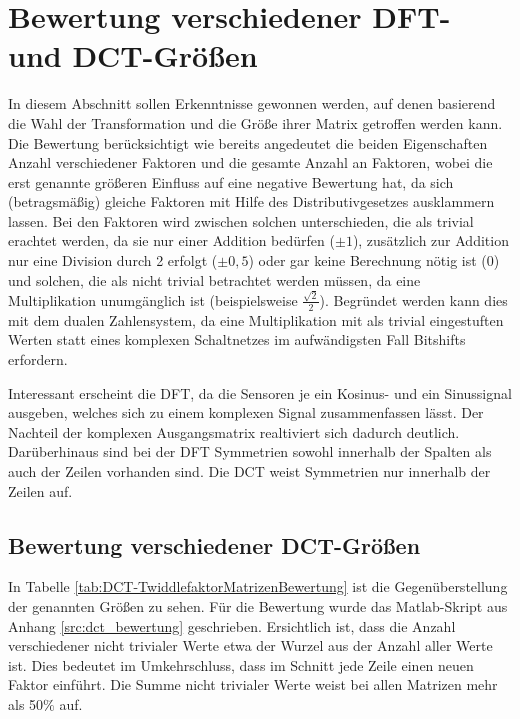 \section{Bewertung verschiedener DFT- und DCT-Größen}\label{sec:BewertungVerschiedenerGroessen}
In diesem Abschnitt sollen Erkenntnisse gewonnen werden, auf denen basierend die Wahl der Transformation und die Größe ihrer Matrix getroffen werden kann.
Die Bewertung berücksichtigt wie bereits angedeutet die beiden Eigenschaften Anzahl verschiedener Faktoren und die gesamte Anzahl an Faktoren, wobei die erst genannte 
größeren Einfluss auf eine negative Bewertung hat, da sich (betragsmäßig) gleiche Faktoren mit Hilfe des Distributivgesetzes ausklammern lassen.
Bei den Faktoren wird zwischen solchen unterschieden, die als trivial erachtet werden, da sie nur einer Addition bedürfen ($\pm1$), zusätzlich
zur Addition nur eine Division durch 2 erfolgt ($\pm0,5$) oder gar keine Berechnung nötig ist ($0$) und solchen, die als nicht trivial betrachtet werden müssen, da eine Multiplikation
unumgänglich ist (beispielsweise $\tfrac{\sqrt{2}}{2}$). Begründet werden kann dies mit dem dualen Zahlensystem, da eine Multiplikation mit als trivial eingestuften Werten statt eines 
komplexen Schaltnetzes im aufwändigsten Fall Bitshifts erfordern.

Interessant erscheint die DFT, da die Sensoren je ein Kosinus- und ein Sinussignal ausgeben, welches sich zu einem komplexen Signal zusammenfassen lässt. Der Nachteil der komplexen Ausgangsmatrix realtiviert sich dadurch deutlich. Darüberhinaus sind bei der DFT Symmetrien sowohl innerhalb der Spalten als auch der Zeilen vorhanden sind. Die DCT weist Symmetrien nur innerhalb der Zeilen auf.


\subsection{Bewertung verschiedener DCT-Größen}
In Tabelle \ref{tab:DCT-TwiddlefaktorMatrizenBewertung} ist die Gegenüberstellung der genannten Größen zu sehen. Für die Bewertung wurde das 
Matlab-Skript aus Anhang \ref{src:dct_bewertung} geschrieben.
Ersichtlich ist, dass die Anzahl verschiedener nicht trivialer Werte etwa der Wurzel aus der Anzahl aller Werte ist.
Dies bedeutet im Umkehrschluss, dass im Schnitt jede Zeile einen neuen Faktor einführt. Die Summe nicht trivialer Werte weist bei allen Matrizen
mehr als 50$\%$ auf. 

